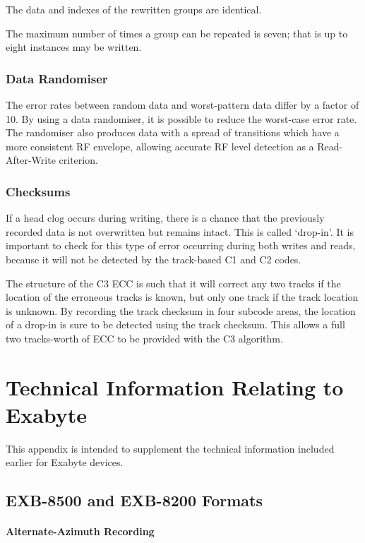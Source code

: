 \documentclass[11pt]{article}
\begin{document}
The data and indexes of the rewritten groups are identical.

The maximum number of times a group can be repeated is seven; that is up to
eight instances may be written.

\subsubsection {Data Randomiser}

The error rates between random data and worst-pattern data differ by a
factor of 10. By using a data randomiser, it is possible to reduce the
worst-case error rate. The randomiser also produces data with a spread of
transitions which have a more consistent RF envelope, allowing accurate RF
level detection as a Read-After-Write criterion.

\subsubsection {Checksums}

If a head clog occurs during writing, there is a chance that the previously
recorded data is not overwritten but remains intact. This is called
`drop-in'. It is important to check for this type of error occurring during
both writes and reads, because it will not be detected by the track-based C1
and C2 codes.

The structure of the C3 ECC is such that it will correct any two tracks if
the location of the erroneous tracks is known, but only one track if the
track location is unknown. By recording the track checksum in four subcode
areas, the location of a drop-in is sure to be detected using the track
checksum. This allows a full two tracks-worth of ECC to be provided with the
C3 algorithm.

\pagebreak

\section {Technical Information Relating to Exabyte}

This appendix is intended to supplement the technical information included
earlier for Exabyte devices.

\subsection {EXB-8500 and EXB-8200 Formats}

\paragraph {Alternate-Azimuth Recording}
\end{document}
